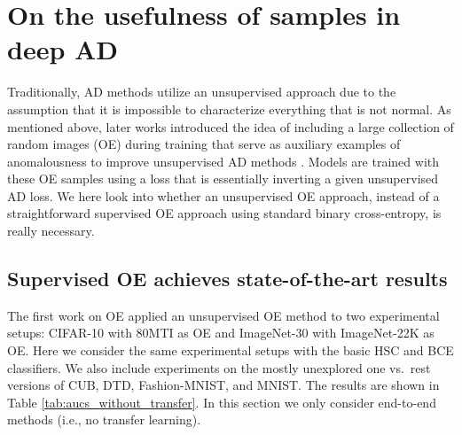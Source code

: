 \documentclass[10pt]{article} \usepackage[accepted]{stylefiles/tmlr}
\begin{document}
\section{On the usefulness of samples in deep AD} \label{sec:meth_experiments}
Traditionally, AD methods utilize an unsupervised approach due to the assumption that it is impossible to characterize everything that is not normal. 
As mentioned above, later works introduced the idea of including a large collection of random images (OE) during training that serve as auxiliary examples of anomalousness to improve unsupervised AD methods \citep{hendrycks2019deep}. 
Models are trained with these OE samples using a loss that is essentially inverting a given unsupervised AD loss. 
We here look into whether an unsupervised OE approach, instead of a straightforward supervised OE approach using standard binary cross-entropy, is really necessary.




\subsection{Supervised OE achieves state-of-the-art results} \label{sec:exp_sota_without_transfer}
The first work on OE \citep{hendrycks2019deep} applied an unsupervised OE method to two experimental setups: CIFAR-10 with 80MTI as OE and ImageNet-30 with ImageNet-22K as OE. 
Here we consider the same experimental setups with the basic HSC and BCE classifiers. 
We also include experiments on the mostly unexplored one vs.~rest versions of CUB, DTD, Fashion-MNIST, and MNIST.
The results are shown in Table \ref{tab:aucs_without_transfer}.
In this section we only consider end-to-end methods (i.e., no transfer learning).
\end{document}
